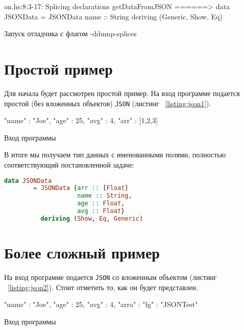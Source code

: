 \begin{ListingEnv}[H]
\begin{Verb}
on.hs:8:3-17: Splicing declarations
    getDataFromJSON
  ======>
    data JSONData
      = JSONData {name :: String}
      deriving (Generic, Show, Eq)
\end{Verb}
\caption{Запуск отладчика с флагом -ddump-splices}
\end{ListingEnv}

\section{Простой пример}
Для начала будет рассмотрен простой пример. На вход программе подается простой (без вложенных объектов) \lstinline{JSON} (листинг ~\ref{listing:json1}).

\begin{ListingEnv}[H]
\begin{Verb}
{
    "name" : "Joe",
    "age" : 25,
    "avg" : 4,
    "arr" : [1,2,3]
}
\end{Verb}
\caption{Вход программы}
\label{listing:json1}
\end{ListingEnv}

В итоге мы получаем тип данных с именованными полями, полностью соответствующий постановленной задаче:

\begin{lstlisting}[language=Haskell]
data JSONData 
        = JSONData {arr :: [Float]
                    name :: String,
                    age :: Float,
                    avg :: Float}
          deriving (Show, Eq, Generic)
\end{lstlisting}

\section{Более сложный пример}

На вход программе подается \lstinline{JSON} со вложенным объектом (листинг ~\ref{listing:json2}).  Стоит отметить то, как он будет представлен. 

\begin{ListingEnv}[H]
\begin{Verb}
{
    "name" : "Joe",
    "age" : 25,
    "avg" : 4,
    "arra" : 
             {
                 "fg" : "JSONTest"  
             }
}
\end{Verb}
\caption{Вход программы}
\label{listing:json2}
\end{ListingEnv}

